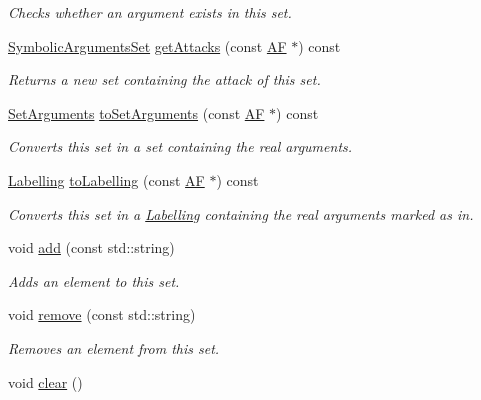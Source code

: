 \begin{DoxyCompactItemize}
\begin{DoxyCompactList}\small\item\em Checks whether an argument exists in this set. \end{DoxyCompactList}\item 
\hyperlink{classSymbolicArgumentsSet}{Symbolic\-Arguments\-Set} \hyperlink{classSymbolicArgumentsSet_a7cc8a64f0bd474b133e4481bfc7134ee}{get\-Attacks} (const \hyperlink{classAF}{A\-F} $\ast$) const 
\begin{DoxyCompactList}\small\item\em Returns a new set containing the attack of this set. \end{DoxyCompactList}\item 
\hyperlink{classSetArguments}{Set\-Arguments} \hyperlink{classSymbolicArgumentsSet_ace624bdb96d794cd432c49c23eec28f3}{to\-Set\-Arguments} (const \hyperlink{classAF}{A\-F} $\ast$) const 
\begin{DoxyCompactList}\small\item\em Converts this set in a set containing the real arguments. \end{DoxyCompactList}\item 
\hyperlink{classLabelling}{Labelling} \hyperlink{classSymbolicArgumentsSet_aae3a59c875c3f91e2879b9a8d67546d8}{to\-Labelling} (const \hyperlink{classAF}{A\-F} $\ast$) const 
\begin{DoxyCompactList}\small\item\em Converts this set in a \hyperlink{classLabelling}{Labelling} containing the real arguments marked as {\ttfamily in}. \end{DoxyCompactList}\item 
void \hyperlink{classSymbolicArgumentsSet_a70bbd33b7e2f7da410890094a02d75b7}{add} (const std\-::string)
\begin{DoxyCompactList}\small\item\em Adds an element to this set. \end{DoxyCompactList}\item 
void \hyperlink{classSymbolicArgumentsSet_a480ef00aa7796e49c212f28633aa1f1c}{remove} (const std\-::string)
\begin{DoxyCompactList}\small\item\em Removes an element from this set. \end{DoxyCompactList}\item 
\hypertarget{classSymbolicArgumentsSet_a3e7efb6f37c1998153411a1cc22438e3}{void \hyperlink{classSymbolicArgumentsSet_a3e7efb6f37c1998153411a1cc22438e3}{clear} ()}\label{classSymbolicArgumentsSet_a3e7efb6f37c1998153411a1cc22438e3}


\end{DoxyCompactItemize}
